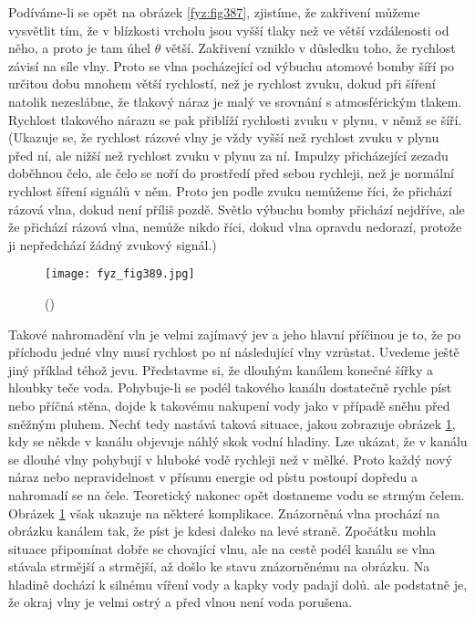 {  Podíváme-li se opět na obrázek \ref{fyz:fig387}, zjistíme, že zakřivení můžeme vysvětlit tím, že 
  v blízkosti vrcholu jsou vyšší tlaky než ve větší vzdálenosti od něho, a proto je tam úhel 
  \(\theta\) větší. Zakřivení vzniklo v důsledku toho, že rychlost závisí na síle vlny. Proto se 
  vlna pocházející od výbuchu atomové bomby šíří po určitou dobu mnohem větší rychlostí, než je 
  rychlost zvuku, dokud při šíření natolik nezeslábne, že tlakový náraz je malý ve srovnání s 
  atmosférickým tlakem. Rychlost tlakového nárazu se pak přiblíží rychlosti zvuku v plynu, v němž 
  se šíří. (Ukazuje se, že rychlost rázové vlny je vždy vyšší než rychlost zvuku v plynu před ní, 
  ale nižší než rychlost zvuku v plynu za ní. Impulzy přicházející zezadu doběhnou čelo, ale čelo 
  se noří do prostředí před sebou rychleji, než je normální rychlost šíření signálů v něm. Proto 
  jen podle zvuku nemůžeme říci, že přichází rázová vlna, dokud není příliš pozdě. Světlo výbuchu 
  bomby přichází nejdříve, ale že přichází rázová vlna, nemůže nikdo říci, dokud vlna opravdu 
  nedorazí, protože ji nepředchází žádný zvukový signál.)
  
  \begin{figure}[ht!] %
    \centering
    \texttt{[image: fyz\_fig389.jpg]}
    \caption{
             (\cite[s.~689]{Feynman01})}
    \label{fyz:fig389}
  \end{figure}
  
  Takové nahromadění vln je velmi zajímavý jev a jeho hlavní příčinou je to, že po příchodu jedné 
  vlny musí rychlost po ní následující vlny vzrůstat. Uvedeme ještě jiný příklad téhož jevu. 
  Představme si, že dlouhým kanálem konečné šířky a hloubky teče voda. Pohybuje-li se podél 
  takového kanálu dostatečně rychle píst nebo příčná stěna, dojde k takovému nakupení vody jako v 
  případě sněhu před sněžným pluhem. Nechť tedy nastává taková situace, jakou zobrazuje obrázek 
  \ref{fyz:fig389}, kdy se někde v kanálu objevuje náhlý skok vodní hladiny. Lze ukázat, že v 
  kanálu se dlouhé vlny pohybují v hluboké vodě rychleji než v mělké. Proto každý nový náraz nebo 
  nepravidelnost v přísunu energie od pístu postoupí dopředu a nahromadí se na čele. Teoretický 
  nakonec opět dostaneme vodu se strmým čelem. Obrázek \ref{fyz:fig389} však ukazuje na některé 
  komplikace. Znázorněná vlna prochází na obrázku kanálem tak, že píst je kdesi daleko na levé 
  straně. Zpočátku mohla situace připomínat dobře se chovající vlnu, ale na cestě podél kanálu se 
  vlna stávala strmější a strmější, až došlo ke stavu znázorněnému na obrázku. Na hladině dochází k 
  silnému víření vody a kapky vody padají dolů. ale podstatně je, že okraj vlny je velmi ostrý a 
  před vlnou není voda porušena.  
  
}
